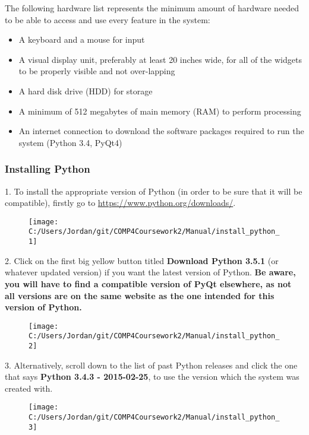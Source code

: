 The following hardware list represents the minimum amount of hardware needed to be able to access and use every feature in the system:

\begin{itemize}
	\item A keyboard and a mouse for input 
	\item A visual display unit, preferably at least 20 inches wide, for all of the widgets to be properly visible and not over-lapping
	\item A hard disk drive (HDD) for storage
	\item A minimum of 512 megabytes of main memory (RAM) to perform processing
	\item An internet connection to download the software packages required to run the system (Python 3.4, PyQt4)
\end{itemize}

\subsubsection{Installing Python}

1. To install the appropriate version of Python (in order to be sure that it will be compatible), firstly go to \url{https://www.python.org/downloads/}.

\begin{figure}[H]
    \texttt{[image: C:/Users/Jordan/git/COMP4Coursework2/Manual/install\_python\_1]}
\end{figure}

2. Click on the first big yellow button titled \textbf{Download Python 3.5.1} (or whatever updated version) if you want the latest version of Python. \textbf{Be aware, you will have to find a compatible version of PyQt elsewhere, as not all versions are on the same website as the one intended for this version of Python.}

\begin{figure}[H]
    \texttt{[image: C:/Users/Jordan/git/COMP4Coursework2/Manual/install\_python\_2]}
\end{figure}

3. Alternatively, scroll down to the list of past Python releases and click the one that says \textbf{Python 3.4.3 - 2015-02-25}, to use the version which the system was created with. 

\begin{figure}[H]
    \texttt{[image: C:/Users/Jordan/git/COMP4Coursework2/Manual/install\_python\_3]}
\end{figure}


